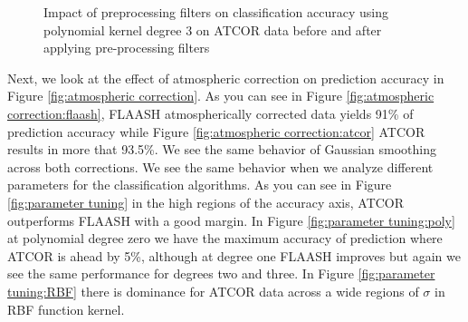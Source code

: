 \documentclass[remotesensing,article,accept,moreauthors,pdftex,12pt,a4paper]{mdpi}
\begin{document}
\begin{figure}[t]
  \centering
  \hspace{1em}%
   \caption{Impact of preprocessing filters on classification accuracy using polynomial kernel degree 3 on ATCOR data before and after applying pre-processing filters}
 \label{fig:before-after removing water absorbtion bands}
\end{figure}

Next, we look at the effect of atmospheric correction on prediction accuracy in Figure \ref{fig:atmospheric correction}. As you can see in Figure \ref{fig:atmospheric correction:flaash}, FLAASH atmospherically corrected data yields 91\% of prediction accuracy while Figure \ref{fig:atmospheric correction:atcor} ATCOR results in more that 93.5\%. We see the same behavior of Gaussian smoothing across both corrections. We see the same behavior when we analyze different parameters for the classification algorithms. As you can see in Figure \ref{fig:parameter tuning} in the high regions of the accuracy axis, ATCOR outperforms FLAASH with a good margin. In Figure \ref{fig:parameter tuning:poly} at polynomial degree zero we have the maximum accuracy of prediction where ATCOR is ahead by 5\%, although at degree one FLAASH improves but again we see the same performance for degrees two and three. In Figure \ref{fig:parameter tuning:RBF} there is dominance for ATCOR data across a wide regions of $\sigma$ in RBF function kernel.
\end{document}

